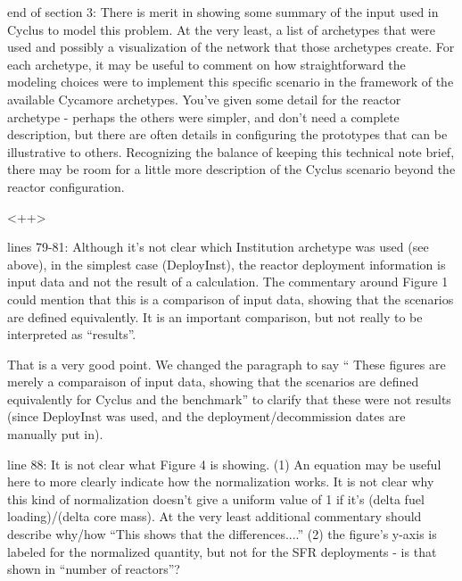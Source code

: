 \documentclass[answers,11pt]{exam}
\begin{document}
\begin{questions}
        \question end of section 3: There is merit in showing some summary of 
        the input used in Cyclus to model this problem.  At the very least, a 
        list of archetypes that were used and possibly a visualization of the 
        network that those archetypes create.  For each archetype, it may be 
        useful to comment on how straightforward the modeling choices were to 
        implement this specific scenario in the framework of the available 
        Cycamore archetypes.  You've given some detail for the reactor 
        archetype - perhaps the others were simpler, and don't need a complete 
        description, but there are often details in configuring the prototypes 
        that can be illustrative to others.  Recognizing the balance of keeping 
        this technical note brief, there may be room for a little more 
        description of the Cyclus scenario beyond the reactor configuration.

        \begin{solution}
                <++>
        \end{solution}

        \question lines 79-81: Although it's not clear which Institution 
        archetype was used (see above), in the simplest case (DeployInst), the 
        reactor deployment information is input data and not the result of a 
        calculation.  The commentary around Figure 1 could mention that this is 
        a comparison of input data, showing that the scenarios are defined 
        equivalently.  It is an important comparison, but not really to be 
        interpreted as ``results''.

        \begin{solution}
        That is a very good point. We changed the paragraph to say
        `` These figures are merely a comparaison of input data, showing that
        the scenarios are defined equivalently for Cyclus and the benchmark''
        to clarify that these were not results (since DeployInst was used,
        and the deployment/decommission dates are manually put in).
        \end{solution}


        \question line 88: It is not clear what Figure 4 is showing.  (1) An 
        equation may be useful here to more clearly indicate how the 
        normalization works. It is not clear why this kind of normalization 
        doesn't give a uniform value of 1 if it's (delta fuel loading)/(delta 
        core mass).  At the very least additional commentary should describe 
        why/how ``This shows that the differences....''  (2) the figure's 
        y-axis is labeled for the normalized quantity, but not for the SFR 
        deployments - is that shown in ``number of reactors''?


\end{questions}
\end{document}
